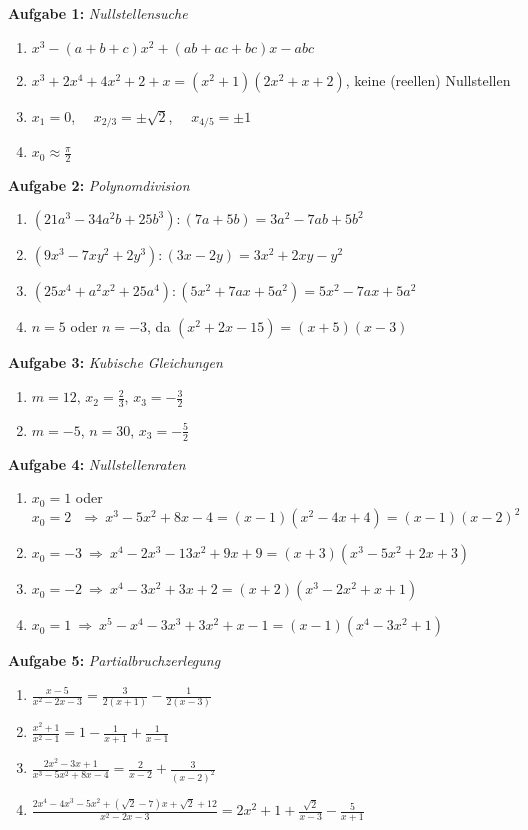 
\textbf{Aufgabe 1: } \emph{Nullstellensuche}
\begin{enumerate}[label=(\alph*)]
\item $x^3-(a+b+c)x^2+(ab+ac+bc)x-abc$
\item $x^3+2x^4+4x^2+2+x=(x^2+1)(2x^2+x+2)$, keine (reellen) Nullstellen
\item $x_1=0$, \ \ $x_{2/3}=\pm\sqrt{2}$, \ \ $x_{4/5}=\pm 1$
\item $x_0\approx\frac{\pi}{2}$
\end{enumerate}
\vspace{0.7cm}
%
\textbf{Aufgabe 2: } \emph{Polynomdivision}
\begin{enumerate}[label=(\alph*)]
\item $(21a^3-34a^2b+25b^3):(7a+5b)=3a^2-7ab+5b^2$
\item $(9x^3-7xy^2+2y^3):(3x-2y)=3x^2+2xy-y^2$
\item $(25x^4+a^2x^2+25a^4):(5x^2+7ax+5a^2)=5x^2-7ax+5a^2$
\item $n=5$ oder $n=-3$, da $(x^2+2x-15)=(x+5)(x-3)$
\end{enumerate}
\vspace{0.7cm}
%
\textbf{Aufgabe 3: } \emph{Kubische Gleichungen}
\begin{enumerate}[label=(\alph*)]
\item $m=12$, $x_2=\frac{2}{3}$, $x_3=-\frac{3}{2}$
\item $m=-5$, $n=30$, $x_3=-\frac{5}{2}$
\end{enumerate}
\vspace{0.7cm}

%
\textbf{Aufgabe 4: } \emph{Nullstellenraten}
\begin{enumerate}[label=(\alph*)]
\item $x_0=1$ oder $x_0=2\ \ \ \Rightarrow\ x^3-5x^2+8x-4=(x-1)(x^2-4x+4)=(x-1)(x-2)^2$
\item $x_0=-3\ \Rightarrow\ x^4-2x^3-13x^2+9x+9=(x+3)(x^3-5x^2+2x+3)$
\item $x_0=-2\ \Rightarrow\ x^4-3x^2+3x+2=(x+2)(x^3-2x^2+x+1)$
\item $x_0=1\ \Rightarrow\ x^5-x^4-3x^3+3x^2+x-1=(x-1)(x^4-3x^2+1)$
\end{enumerate}
\vspace{0.7cm}
%
\newpage
\textbf{Aufgabe 5: } \emph{Partialbruchzerlegung}
\begin{enumerate}[label=(\alph*)]
\item $\frac{x-5}{x^2-2x-3}=\frac{3}{2(x+1)}-\frac{1}{2(x-3)}$
\item $\frac{x^2+1}{x^2-1}=1-\frac{1}{x+1}+\frac{1}{x-1}$
\item $\frac{2x^2-3x+1}{x^3-5x^2+8x-4}=\frac{2}{x-2}+\frac{3}{(x-2)^2}$
\item $\frac{2x^4-4x^3-5x^2+(\sqrt{2}-7)x+\sqrt{2}+12}{x^2-2x-3}=2x^2+1+\frac{\sqrt{2}}{x-3}-\frac{5}{x+1}$
\end{enumerate}
\vspace{0.7cm}
%

